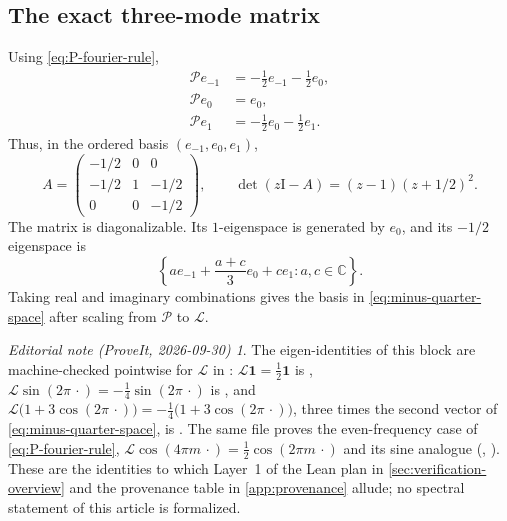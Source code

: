 \documentclass[11pt,a4paper]{article}
\theoremstyle{definition}
\theoremstyle{remark}
\newtheorem*{ednote}{Editorial note (ProveIt, 2026-09-30)}
\newcommand{\C}{\mathbb C}
\newcommand{\Lop}{\mathcal L}
\newcommand{\Pop}{\mathcal P}
\newcommand{\id}{\mathrm I}
\newcommand{\one}{\mathbf 1}
\begin{document}
\subsection{The exact three-mode matrix}
Using \eqref{eq:P-fourier-rule},
\begin{align}
 \Pop e_{-1}&=-\frac12e_{-1}-\frac12e_0,\\
 \Pop e_0&=e_0,\\
 \Pop e_1&=-\frac12e_0-\frac12e_1.
 \label{eq:mode-actions}
\end{align}
Thus, in the ordered basis $(e_{-1},e_0,e_1)$,
\begin{equation}
 A=
 \begin{pmatrix}
 -1/2&0&0\\
 -1/2&1&-1/2\\
 0&0&-1/2
 \end{pmatrix},
 \qquad
 \det(z\id-A)=(z-1)(z+1/2)^2.
 \label{eq:finite-matrix}
\end{equation}
The matrix is diagonalizable.  Its $1$-eigenspace is generated by $e_0$,
and its $-1/2$ eigenspace is
\begin{equation}
 \left\{ae_{-1}+\frac{a+c}{3}e_0+ce_1:a,c\in\C\right\}.
 \label{eq:minus-half-complex}
\end{equation}
Taking real and imaginary combinations gives the basis in
\eqref{eq:minus-quarter-space} after scaling from $\Pop$ to $\Lop$.
\begin{ednote}
The eigen-identities of this block are machine-checked pointwise for $\Lop$
in
:
$\Lop\one=\tfrac12\one$ is ,
$\Lop\sin(2\pi\,\cdot)=-\tfrac14\sin(2\pi\,\cdot)$ is
, and
$\Lop\bigl(1+3\cos(2\pi\,\cdot)\bigr)=-\tfrac14\bigl(1+3\cos(2\pi\,\cdot)\bigr)$,
three times the second vector of \eqref{eq:minus-quarter-space}, is
. The same file proves the
even-frequency case of \eqref{eq:P-fourier-rule},
$\Lop\cos(4\pi m\,\cdot)=\tfrac12\cos(2\pi m\,\cdot)$ and its sine analogue
(,
). These are the identities to
which Layer~1 of the Lean plan in \cref{sec:verification-overview} and
the provenance table in \cref{app:provenance} allude; no spectral statement of this article is
formalized.
\end{ednote}
\end{document}
